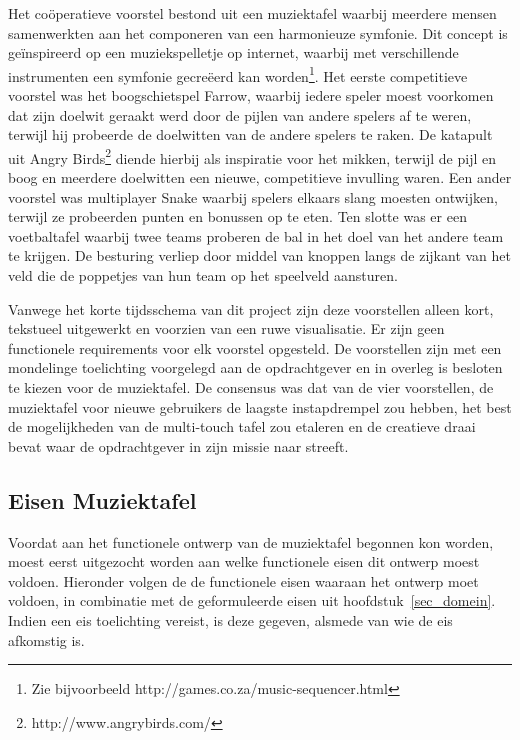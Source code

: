 \documentclass{acm}
\begin{document}
Het co\"operatieve voorstel bestond uit een muziektafel waarbij meerdere mensen samenwerkten aan het componeren van een harmonieuze symfonie. Dit concept is ge\"inspireerd op een muziekspelletje op internet, waarbij met verschillende instrumenten een symfonie gecre\"eerd kan worden\footnote{Zie bijvoorbeeld http://games.co.za/music-sequencer.html}. Het eerste competitieve voorstel was het boogschietspel Farrow, waarbij iedere speler moest voorkomen dat zijn doelwit geraakt werd door de pijlen van andere spelers af te weren, terwijl hij probeerde de doelwitten van de andere spelers te raken. De katapult uit Angry Birds\footnote{http://www.angrybirds.com/} diende hierbij als inspiratie voor het mikken, terwijl de pijl en boog en meerdere doelwitten een nieuwe, competitieve invulling waren. Een ander voorstel was multiplayer Snake waarbij spelers elkaars slang moesten ontwijken, terwijl ze probeerden punten en bonussen op te eten. Ten slotte was er een voetbaltafel waarbij twee teams proberen de bal in het doel van het andere team te krijgen. De besturing verliep door middel van knoppen langs de zijkant van het veld die de poppetjes van hun team op het speelveld aansturen.

Vanwege het korte tijdsschema van dit project zijn deze voorstellen alleen kort, tekstueel uitgewerkt en voorzien van een ruwe visualisatie. Er zijn geen functionele requirements voor elk voorstel opgesteld. De voorstellen zijn met een mondelinge toelichting voorgelegd aan de opdrachtgever en in overleg is besloten te kiezen voor de muziektafel. De consensus was dat van de vier voorstellen, de muziektafel voor nieuwe gebruikers de laagste instapdrempel zou hebben, het best de mogelijkheden van de multi-touch tafel zou etaleren en de creatieve draai bevat waar de opdrachtgever in zijn missie naar streeft.

\subsection{Eisen Muziektafel}
Voordat aan het functionele ontwerp van de muziektafel begonnen kon worden, moest eerst uitgezocht worden aan welke functionele eisen dit ontwerp moest voldoen. Hieronder volgen de de functionele eisen waaraan het ontwerp moet voldoen, in combinatie met de geformuleerde eisen uit hoofdstuk~\ref{sec_domein}. Indien een eis toelichting vereist, is deze gegeven, alsmede van wie de eis afkomstig is.
\end{document}
